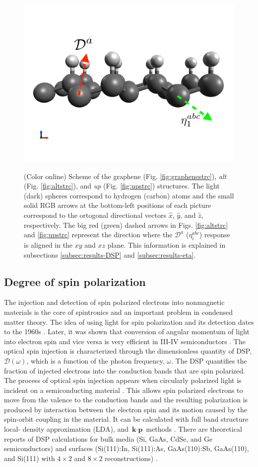 \documentclass[pss]{wiley2sp} %
\begin{document}
\begin{figure}[t]
{ \includegraphics[width=0.49\linewidth]{strc/up-2e-vec2}\label{fig:upstrc}}
\caption{(Color online) Scheme of the graphene (Fig. \ref{fig:graphenestrc}), \emph{alt} (Fig. \ref{fig:altstrc}), and \emph{up} (Fig. \ref{fig:upstrc}) structures. The light (dark) spheres correspond to hydrogen (carbon) atoms and the small solid RGB arrows at the bottom-left positions of each picture correspond to the ortogonal directional vectors $\hat{x}$, $\hat{y}$, and $\hat{z}$, respectively. The big red (green) dashed arrows in Figs. \ref{fig:altstrc} and \ref{fig:upstrc} represent the direction where the $\mathcal{D}^{a}$ ($\eta^{abc}_{i}$) response is aligned in the $xy$ and $xz$ plane. This information is explained in subsections \ref{subsec:results-DSP} and \ref{subsec:results-eta}.\label{fig:structures}}
\end{figure}

\subsection{Degree of spin polarization}

The injection and detection of spin polarized electrons into nonmagnetic materials is the core of spintronics \cite{vzuticRMP04,fertRMP08} and an important  problem in condensed matter theory.
The idea of using light for spin polarization and its detection dates to the 1960s \cite{LampelPRL68}. Later, it was shown that conversion of angular momentum of light into electron spin and vice versa is very efficient in III-IV semiconductors \cite{dyakonovOO84}. The optical spin injection is characterized through the dimensionless quantity of DSP, $\mathcal{D}(\omega)$, which is a function of the photon frequency, $\omega$. The DSP quantifies the fraction of injected electrons into the conduction bands that are spin polarized.
The process of optical spin injection appears when circularly polarized light is incident on a semiconducting material \cite{dyakonovOO84}. This allows spin polarized electrons to move from the valence to the conduction bands and the resulting polarization is produced by interaction between the electron spin and its motion caused by the spin-orbit coupling in the material. It can be calculated with full band structure local- density approximation (LDA), and $\textbf{k}\cdot\textbf{p}$ methods \cite{nastosPRB07,cabellosPRB09}. There are theoretical reports of DSP calculations for bulk media (Si, GaAs, CdSe, and Ge semiconductors) \cite{nastosPRB07,cabellosPRB09} and surfaces (Si(111):In, Si(111):As, GaAs(110):Sb, GaAs(110), and Si(111) with $4\times2$ and $8\times2$ reconstructions) \cite{mendozaPRB12,arzatePRB14}. 
\end{document}

